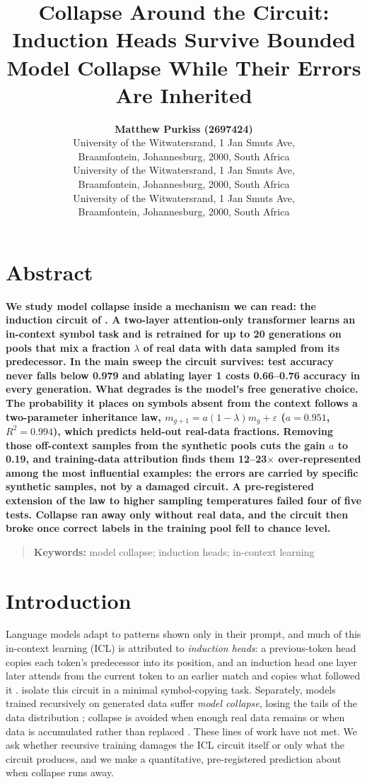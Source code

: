 \documentclass[10pt,letterpaper]{article}
\title{Collapse Around the Circuit: Induction Heads Survive Bounded Model Collapse While Their Errors Are Inherited}
\author{{\large \bf Matthew Purkiss (2697424)} \\ University of the Witwatersrand, 1 Jan Smuts Ave,\\ Braamfontein, Johannesburg, 2000, South Africa
  \AND {\large \bf Sunay Master (2677874)} \\ University of the Witwatersrand, 1 Jan Smuts Ave,\\ Braamfontein, Johannesburg, 2000, South Africa
  \AND {\large \bf Harshil Vallabh (2656158)} \\ University of the Witwatersrand, 1 Jan Smuts Ave,\\ Braamfontein, Johannesburg, 2000, South Africa}
\begin{document}
\maketitle
\phantom{.}
\newpage
\phantom{.}
\newpage

\section{Abstract}
{
\bf
{}
We study model collapse inside a mechanism we can read: the induction circuit of \citet{singh2024needs}. A two-layer attention-only transformer learns an in-context symbol task and is retrained for up to 20 generations on pools that mix a fraction $\lambda$ of real data with data sampled from its predecessor. In the main sweep the circuit survives: test accuracy never falls below 0.979 and ablating layer 1 costs 0.66--0.76 accuracy in every generation. What degrades is the model's free generative choice. The probability it places on symbols absent from the context follows a two-parameter inheritance law, $m_{g+1} = a(1-\lambda)m_g + \varepsilon$ ($a = 0.951$, $R^2 = 0.994$), which predicts held-out real-data fractions. Removing those off-context samples from the synthetic pools cuts the gain $a$ to 0.19, and training-data attribution finds them 12--23$\times$ over-represented among the most influential examples: the errors are carried by specific synthetic samples, not by a damaged circuit. A pre-registered extension of the law to higher sampling temperatures failed four of five tests. Collapse ran away only without real data, and the circuit then broke once correct labels in the training pool fell to chance level.
}
\begin{quote}
\small
\textbf{Keywords:}
model collapse; induction heads; in-context learning
\end{quote}

\section{Introduction} \label{Intro}
Language models adapt to patterns shown only in their prompt, and much of this in-context learning (ICL) is attributed to \emph{induction heads}: a previous-token head copies each token's predecessor into its position, and an induction head one layer later attends from the current token to an earlier match and copies what followed it \citep{olsson2022context}. \citet{singh2024needs} isolate this circuit in a minimal symbol-copying task. Separately, models trained recursively on generated data suffer \emph{model collapse}, losing the tails of the data distribution \citep{shumailov2023curse,shumailov2024ai}; collapse is avoided when enough real data remains \citep{bertrand2023stability} or when data is accumulated rather than replaced \citep{gerstgrasser2024model}. These lines of work have not met. We ask whether recursive training damages the ICL circuit itself or only what the circuit produces, and we make a quantitative, pre-registered prediction about when collapse runs away.
\end{document}
